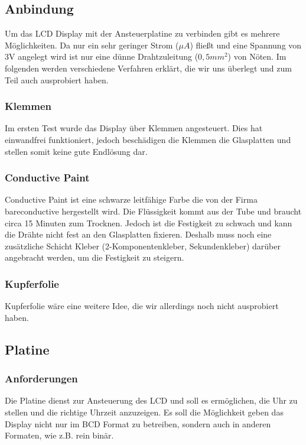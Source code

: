 \subsection{Anbindung}
Um das LCD Display mit der Ansteuerplatine zu verbinden gibt es mehrere Möglichkeiten. Da nur ein sehr geringer Strom (\(\mu A\)) fließt und eine Spannung von 3V angelegt wird ist nur eine dünne Drahtzuleitung (\(0,5 mm^2\)) von Nöten. Im folgenden werden verschiedene Verfahren erklärt, die wir uns überlegt und zum Teil auch ausprobiert haben.

\subsubsection{Klemmen}
Im ersten Test wurde das Display über Klemmen angesteuert. Dies hat einwandfrei funktioniert, jedoch beschädigen die Klemmen die Glasplatten und stellen somit keine gute Endlösung dar.

\subsubsection{Conductive Paint}
Conductive Paint ist eine schwarze leitfähige Farbe die von der Firma bareconductive hergestellt wird. Die Flüssigkeit kommt aus der Tube und braucht circa 15 Minuten zum Trocknen. Jedoch ist die Festigkeit zu schwach und kann die Drähte nicht fest an den Glasplatten fixieren. Deshalb muss noch eine zusätzliche Schicht Kleber (2-Komponentenkleber, Sekundenkleber) darüber angebracht werden, um die Festigkeit zu steigern.

\subsubsection{Kupferfolie}
Kupferfolie wäre eine weitere Idee, die wir allerdings noch nicht ausprobiert haben.


\subsection{Platine}

\subsubsection{Anforderungen}
Die Platine dienst zur Ansteuerung des LCD und soll es ermöglichen, die Uhr zu stellen und die richtige Uhrzeit anzuzeigen. Es soll die Möglichkeit geben das Display nicht nur im BCD Format zu betreiben, sondern auch in anderen Formaten, wie z.B. rein binär.

